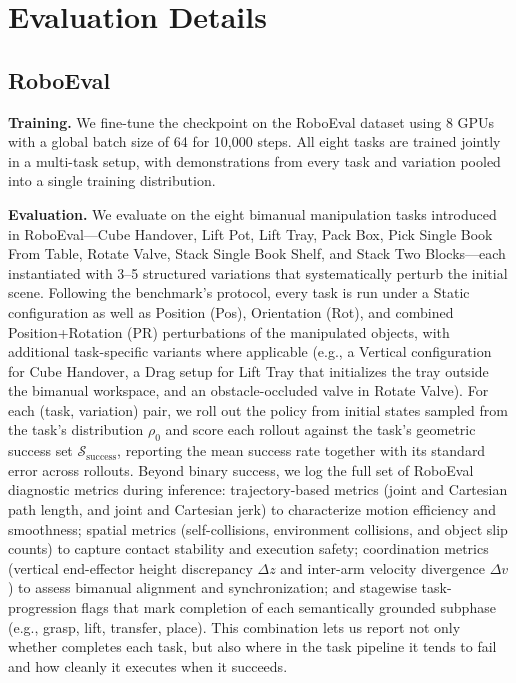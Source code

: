 \section{Evaluation Details}
\label{supp:eval}

\subsection{RoboEval}
\textbf{Training.} We fine-tune the \molmoacttpos checkpoint on the RoboEval dataset using 8 GPUs with a global batch size of 64 for 10{,}000 steps. All eight tasks are trained jointly in a multi-task setup, with demonstrations from every task and variation pooled into a single training distribution.



\textbf{Evaluation.} We evaluate \molmoacttpos on the eight bimanual manipulation tasks introduced in RoboEval---Cube Handover, Lift Pot, Lift Tray, Pack Box, Pick Single Book From Table, Rotate Valve, Stack Single Book Shelf, and Stack Two Blocks---each instantiated with 3--5 structured variations that systematically perturb the initial scene. Following the benchmark's protocol, every task is run under a Static configuration as well as Position (Pos), Orientation (Rot), and combined Position+Rotation (PR) perturbations of the manipulated objects, with additional task-specific variants where applicable (e.g., a Vertical configuration for Cube Handover, a Drag setup for Lift Tray that initializes the tray outside the bimanual workspace, and an obstacle-occluded valve in Rotate Valve). For each (task, variation) pair, we roll out the policy from initial states sampled from the task's distribution $\rho_0$ and score each rollout against the task's geometric success set $\mathcal{S}_{\text{success}}$, reporting the mean success rate together with its standard error across rollouts. Beyond binary success, we log the full set of RoboEval diagnostic metrics during inference: trajectory-based metrics (joint and Cartesian path length, and joint and Cartesian jerk) to characterize motion efficiency and smoothness; spatial metrics (self-collisions, environment collisions, and object slip counts) to capture contact stability and execution safety; coordination metrics (vertical end-effector height discrepancy $\Delta z$ and inter-arm velocity divergence $\Delta v$) to assess bimanual alignment and synchronization; and stagewise task-progression flags that mark completion of each semantically grounded subphase (e.g., grasp, lift, transfer, place). This combination lets us report not only whether \molmoacttpos completes each task, but also where in the task pipeline it tends to fail and how cleanly it executes when it succeeds.

